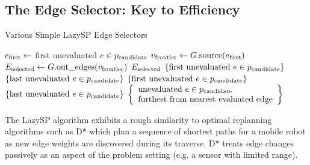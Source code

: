 \subsection{The Edge Selector: Key to Efficiency}

\begin{algorithm}[t]
\caption{Various Simple LazySP Edge Selectors}
\begin{algorithmic}[1]
   \State $e_{\mbox{\scriptsize first}} \leftarrow$ first unevaluated $e \in p_{\mbox{\scriptsize candidate}}$
   \State $v_{\mbox{\scriptsize frontier}} \leftarrow G.\mbox{source}(e_{\mbox{\scriptsize first}})$
   \State $E_{\mbox{\scriptsize selected}} \leftarrow G.\mbox{out\_edges}(v_{\mbox{\scriptsize frontier}})$
   \State \Return $E_{\mbox{\scriptsize selected}}$
\EndFunction
\vspace{0.02in}
   \State \Return $\{ \mbox{first unevaluated } e \in p_{\mbox{\scriptsize candidate}} \}$
\EndFunction
\vspace{0.02in}
   \State \Return $\{ \mbox{last unevaluated } e \in p_{\mbox{\scriptsize candidate}} \}$
\EndFunction
\vspace{0.02in}
      \State \Return $\{ \mbox{first unevaluated } e \in p_{\mbox{\scriptsize candidate}} \}$
   \Else
      \State \Return $\{ \mbox{last unevaluated } e \in p_{\mbox{\scriptsize candidate}} \}$
   \EndIf
\EndFunction
\vspace{0.02in}
   \State \Return $\left\{ \begin{array}{ll}
      \mbox{unevaluated } e \in p_{\mbox{\scriptsize candidate}} \\
      \mbox{furthest from nearest evaluated edge}
      \end{array} \right\}$
\EndFunction
\end{algorithmic}
\label{alg:simple-selectors}
\end{algorithm}


The LazySP algorithm exhibits a rough similarity to optimal
replanning algorithms such as
D* \citep{stentz1994dstar} \citep{stentz1995focusseddstar}
which plan a sequence of shortest paths for a mobile robot
as new edge weights are discovered during its traverse.
D* treats edge changes
passively as an aspect of the problem setting
(e.g. a sensor with limited range).

